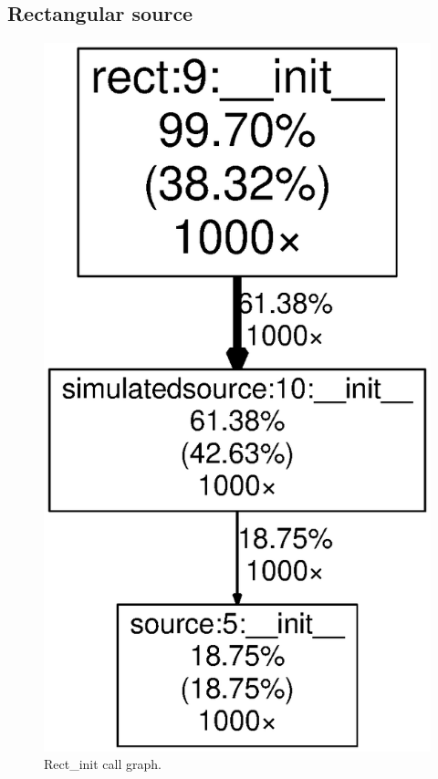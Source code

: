 \documentclass[a4paper, openany, oneside]{memoir}
\begin{document}
\subsection{Rectangular source}
\label{sub:rectangular_source}

\begin{figure}[H]
    \centering
    \includegraphics[width=0.8\linewidth]{Rect_init}
    \caption{Rect\_init call graph.}
    \label{fig:Rect_init}
\end{figure}
\end{document}

